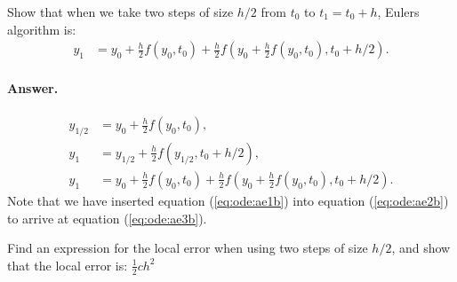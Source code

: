 \documentclass[graybox,sectrefs,envcountresetchap,open=right,final]{svmonodo}
\newenvironment{doconceexercise}{}{}
\begin{document}
\begin{doconceexercise}
Show that when we take two steps of size $h/2$ from $t_0$ to $t_1=t_0+h$, Eulers algorithm is:
\begin{align}
y_{1}&=y_{0}+\frac{h}{2}f(y_0,t_0)+\frac{h}{2}f(y_0+\frac{h}{2}f(y_0,t_0),t_0+h/2).
\end{align}

\paragraph{Answer.}
\begin{align}
y_{1/2}&=y_0+\frac{h}{2}f(y_0,t_0),\label{eq:ode:ae1b}\\ 
y_{1}&=y_{1/2}+\frac{h}{2}f(y_{1/2},t_0+h/2),\label{eq:ode:ae2b}\\ 
y_{1}&=y_{0}+\frac{h}{2}f(y_0,t_0)+\frac{h}{2}f(y_0+\frac{h}{2}f(y_0,t_0),t_0+h/2).\label{eq:ode:ae3b}
\end{align}
Note that we have inserted
equation (\ref{eq:ode:ae1b}) into equation (\ref{eq:ode:ae2b}) to arrive at equation (\ref{eq:ode:ae3b}).



Find an expression for the local error when using two steps of size $h/2$, and show that the local error is: $\frac{1}{2}ch^2$


\end{doconceexercise}
\end{document}
